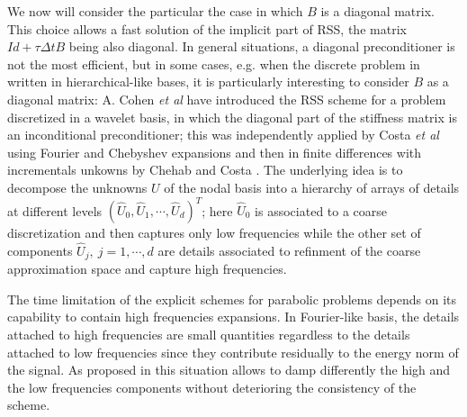 {%

We now will consider the particular  the case  in which $B$ is a diagonal matrix. This choice allows a fast solution of the implicit part of RSS, the matrix $Id+\tau \Delta t B$ being also diagonal. In general situations, a diagonal preconditioner is not the most efficient, but in some cases, e.g. when the discrete problem in written in hierarchical-like bases, it is particularly interesting to consider $B$ as a diagonal matrix: A. Cohen {\it et al} \cite{AverbuchCohenIsraeli} have introduced the RSS scheme for a problem discretized in a wavelet basis, in which the diagonal part of the stiffness matrix is an inconditional preconditioner; this was independently applied by Costa {\it et al} \cite{BCostaPHD,CDGT} using Fourier and Chebyshev expansions and then in finite differences with incrementals unkowns by Chehab and Costa \cite{ChehabCosta1,ChehabCosta2,ccraptech}. The underlying idea is to decompose the unknowns $U$ of the nodal basis into a hierarchy of arrays of details at different levels $({\hat U}_0, {\hat U}_1,\cdots,{\hat U}_d)^T$; here ${\hat U}_0$ is associated to a coarse discretization and then captures only low frequencies
while the other set of components ${\hat U}_j, \ j=1,\cdots, d$ are details associated to refinment of the coarse approximation space and capture high frequencies. 

The time limitation of the explicit schemes for parabolic problems depends on its capability to contain high frequencies expansions. In Fourier-like basis, the details attached to high frequencies are small quantities regardless to the details attached to low frequencies since they contribute residually to the energy norm of the signal. As proposed
in \cite{CDGT,ChehabCosta1,ChehabCosta2} this situation allows to damp differently the high and the low frequencies components without deterioring the consistency of the scheme.

}
